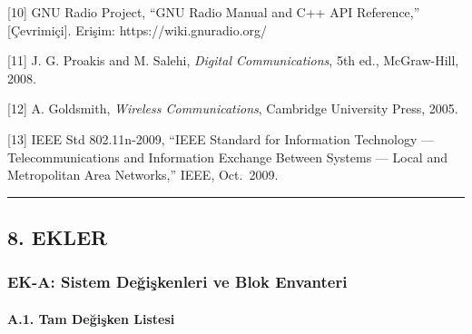 \documentclass[
]{IEEEtran}
\begin{document}
{[}10{]} GNU Radio Project, ``GNU Radio Manual and C++ API Reference,''
{[}Çevrimiçi{]}. Erişim: https://wiki.gnuradio.org/

{[}11{]} J. G. Proakis and M. Salehi, \emph{Digital Communications}, 5th
ed., McGraw-Hill, 2008.

{[}12{]} A. Goldsmith, \emph{Wireless Communications}, Cambridge
University Press, 2005.

{[}13{]} IEEE Std 802.11n-2009, ``IEEE Standard for Information
Technology --- Telecommunications and Information Exchange Between
Systems --- Local and Metropolitan Area Networks,'' IEEE, Oct.~2009.

\begin{center}\rule{0.5\linewidth}{0.5pt}\end{center}

\subsection{8. EKLER}\label{ekler}

\subsubsection{EK-A: Sistem Değişkenleri ve Blok
Envanteri}\label{ek-a-sistem-deux11fiux15fkenleri-ve-blok-envanteri}

\paragraph{A.1. Tam Değişken
Listesi}\label{a.1.-tam-deux11fiux15fken-listesi}
\end{document}
